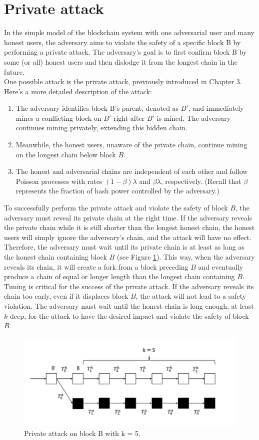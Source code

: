 \documentclass{report}
\begin{document}
\section{Private attack}
In the simple model of the blockchain system with one adversarial user and many honest users, the adversary aims to violate the safety of a specific block B by performing a private attack. The adversary's goal is to first confirm block B by some (or all) honest users and then dislodge it from the longest chain in the future.\\
One possible attack is the private attack, previously introduced in Chapter 3. Here's a more detailed description of the attack:
\begin{enumerate}
	\item The adversary identifies block B's parent, denoted as $B′$, and immediately mines a conflicting block on $B′$ right after $B′$ is mined. The adversary continues mining privately, extending this hidden chain. 
	\item Meanwhile, the honest users, unaware of the private chain, continue mining on the longest chain below block $B$.
	\item The honest and adversarial chains are independent of each other and follow Poisson processes with rates $(1 - \beta)\lambda$ and $\beta\lambda$, respectively. (Recall that $\beta$ represents the fraction of hash power controlled by the adversary.)
\end{enumerate}
To successfully perform the private attack and violate the safety of block $B$, the adversary must reveal its private chain at the right time. If the adversary reveals the private chain while it is still shorter than the longest honest chain, the honest users will simply ignore the adversary's chain, and the attack will have no effect.\\
Therefore, the adversary must wait until its private chain is at least as long as the honest chain containing block $B$ (see Figure \ref{fig:f1}). This way, when the adversary reveals its chain, it will create a fork from a block preceding $B$ and eventually produce a chain of equal or longer length than the longest chain containing $B$.\\
Timing is critical for the success of the private attack. If the adversary reveals its chain too early, even if it displaces block $B$, the attack will not lead to a safety violation. The adversary must wait until the honest chain is long enough, at least $k$ deep, for the attack to have the desired impact and violate the safety of block $B$. 
\begin{figure}[h!]
	\centering
	\includegraphics[width=0.6\linewidth]{Fig/F1}
	\caption{Private attack on block B with k = 5.}
	\label{fig:f1}
\end{figure}
\end{document}
